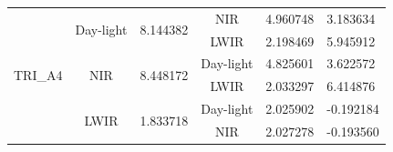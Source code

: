 \documentclass[10pt,twocolumn,letterpaper]{article}
\begin{document}
\begin{table}[]
\begin{tabular}{@{}lccccl@{}}
		\multirow{6}{*}{TRI\_A4} & \multirow{2}{*}{Day-light} & \multirow{2}{*}{8.144382} & NIR                          & 4.960748                  & 3.183634    \\
		&                            &                           & LWIR                         & 2.198469                  & 5.945912    \\
		& \multirow{2}{*}{NIR}       & \multirow{2}{*}{8.448172} & Day-light                    & 4.825601                  & 3.622572    \\
		&                            &                           & LWIR                         & 2.033297                  & 6.414876    \\
		& \multirow{2}{*}{LWIR}      & \multirow{2}{*}{1.833718} & Day-light                    & 2.025902                  & -0.192184   \\
		&                            &                           & NIR                          & 2.027278                  & -0.193560   \\ \bottomrule
	\end{tabular}
\end{table}

{\small


}
\end{document}
